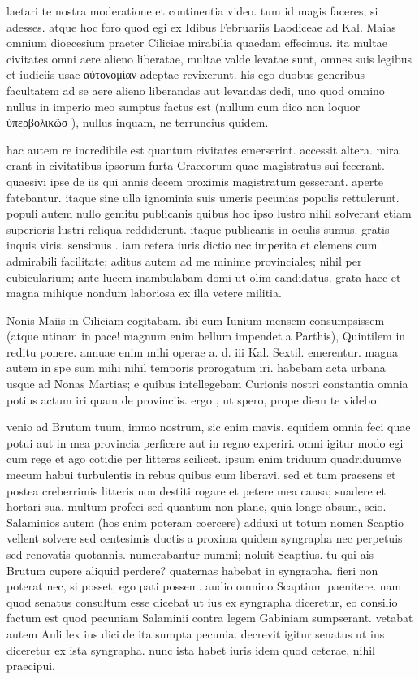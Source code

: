  laetari te nostra moderatione et continentia video. tum id magis faceres, si adesses. atque hoc foro quod egi ex Idibus Februariis Laodiceae ad Kal. Maias omnium dioecesium praeter Ciliciae mirabilia quaedam effecimus. ita multae civitates omni aere alieno liberatae, multae valde levatae sunt, omnes suis legibus et iudiciis usae αὐτονομίαν adeptae revixerunt. his ego duobus generibus facultatem ad se aere alieno liberandas aut levandas dedi, uno quod omnino nullus in imperio meo sumptus factus est (nullum cum dico non loquor ὑπερβολικῶσ ), nullus inquam, ne terruncius quidem.

 hac autem re incredibile est quantum civitates emerserint. accessit altera. mira erant in civitatibus ipsorum furta Graecorum quae magistratus sui fecerant. quaesivi ipse de iis qui annis decem proximis magistratum gesserant. aperte fatebantur. itaque sine ulla ignominia suis umeris pecunias populis rettulerunt. populi autem nullo gemitu publicanis quibus hoc ipso lustro nihil solverant etiam superioris lustri reliqua reddiderunt. itaque publicanis in oculis sumus. gratis inquis viris. sensimus . iam cetera iuris dictio nec imperita et clemens cum admirabili facilitate; aditus autem ad me minime provinciales; nihil per cubicularium; ante lucem inambulabam domi ut olim candidatus. grata haec et magna mihique nondum laboriosa ex illa vetere militia.

 Nonis Maiis in Ciliciam cogitabam. ibi cum Iunium mensem consumpsissem (atque utinam in pace! magnum enim bellum impendet a Parthis), Quintilem in reditu ponere. annuae enim mihi operae a. d. iii Kal. Sextil. emerentur. magna autem in spe sum mihi nihil temporis prorogatum iri. habebam acta urbana usque ad Nonas Martias; e quibus intellegebam Curionis nostri constantia omnia potius actum iri quam de provinciis. ergo , ut spero, prope diem te videbo.

 venio ad Brutum tuum, immo nostrum, sic enim mavis. equidem omnia feci quae potui aut in mea provincia perficere aut in regno experiri. omni igitur modo egi cum rege et ago cotidie per litteras scilicet. ipsum enim triduum quadriduumve mecum habui turbulentis in rebus quibus eum liberavi. sed et tum praesens et postea creberrimis litteris non destiti rogare et petere mea causa; suadere et hortari sua. multum profeci sed quantum non plane, quia longe absum, scio. Salaminios autem (hos enim poteram coercere) adduxi ut totum nomen Scaptio vellent solvere sed centesimis ductis a proxima quidem syngrapha nec perpetuis sed renovatis quotannis. numerabantur nummi; noluit Scaptius. tu qui ais Brutum cupere aliquid perdere? quaternas habebat in syngrapha. fieri non poterat nec, si posset, ego pati possem. audio omnino Scaptium paenitere. nam quod senatus consultum esse dicebat ut ius ex syngrapha diceretur, eo consilio factum est quod pecuniam Salaminii contra legem Gabiniam sumpserant. vetabat autem Auli lex ius dici de ita sumpta pecunia. decrevit igitur senatus ut ius diceretur ex ista syngrapha. nunc ista habet iuris idem quod ceterae, nihil praecipui.

